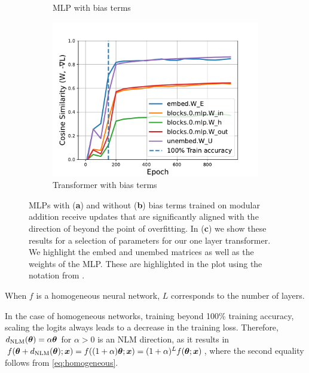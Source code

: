 \begin{dfn}
\begin{figure}[t]
\begin{subfigure}[t]{.33\textwidth}
    \caption{\vspace{-1mm}MLP with bias terms}
    \label{fig:nmm_bias}
\end{subfigure}
\begin{subfigure}[t]{.33\textwidth}
    \includegraphics[width=\linewidth]{grokking_iclr_arxiv/figures/nmm_no_bias_transformer.pdf}
    \caption{\vspace{-1mm}Transformer with bias terms}
    \label{fig:nmm_no_bias_transformer}
\end{subfigure}
\vspace{-1mm}
    \caption{MLPs with (\textbf{a}) and without (\textbf{b}) bias terms trained on modular addition receive updates that are significantly aligned with the direction of \nlm beyond the point of overfitting. In (\textbf{c}) we show these results for a selection of parameters for our one layer transformer. We highlight the embed and unembed matrices as well as the weights of the MLP. These are highlighted in the plot using the notation from \cite{elhage2021mathematical}.\vspace{-4mm}}
\label{fig:proof_of_nmm}
\end{figure}
When $f$ is a homogeneous neural network, $L$ corresponds to the number of layers.
\end{dfn}

In the case of homogeneous networks, training beyond 100\% training accuracy, scaling the logits always leads to a decrease in the training loss. Therefore, $d_\mathrm{NLM}(\boldsymbol{\theta})= \alpha\boldsymbol{\theta}$ for $\alpha>0$ is an NLM direction, as it results in $f(\boldsymbol{\theta} + d_\mathrm{NLM}(\boldsymbol{\theta}); \bm{x}) = f((1+\alpha)\boldsymbol{\theta}; \bm{x}) = (1+\alpha)^Lf(\boldsymbol{\theta}; \bm{x})$, where the second equality follows from \cref{eq:homogeneous}. 

